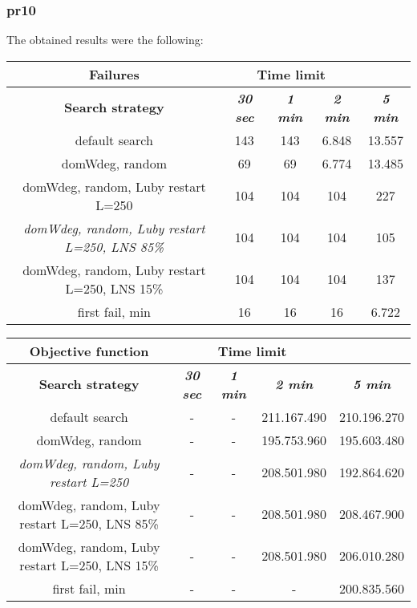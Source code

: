 \subsubsection{pr10}
The obtained results were the following:
{
\renewcommand{\arraystretch}{2}
\begin{longtable}[h]{| c | c | c | c | c |}
    \hline
    \textbf{Failures} & \multicolumn{3}{c}{Time limit} & \\
    \hline
    \textbf{Search strategy} & \textbf{\textit{30 sec}} & \textbf{\textit{1 min}} & \textbf{\textit{2 min}} & \textbf{\textit{5 min}} \\
    \hline
    \endhead
    default search                                         & 143 &  143 &  6.848 & 13.557 \\
    \hline
    domWdeg, random                                        &  69 &   69 &  6.774 & 13.485 \\
    \hline
    domWdeg, random, Luby restart L=250                    & 104 &  104 &  104 &    227 \\
    \hline
    \textit{domWdeg, random, Luby restart L=250, LNS 85\%} & 104 &  104 &  104 &    105 \\
    \hline
    domWdeg, random, Luby restart L=250, LNS 15\%          & 104 &  104 &  104 &    137 \\
    \hline
    first fail, min                                        &  16 &   16 &   16 &   6.722 \\
    \hline
\end{longtable}
}

{
\renewcommand{\arraystretch}{2}
\begin{longtable}[h]{| c | c | c | c | c |}
    \hline
    \textbf{Objective function} & \multicolumn{3}{c}{Time limit} & \\
    \hline
    \textbf{Search strategy} & \textbf{\textit{30 sec}} & \textbf{\textit{1 min}} & \textbf{\textit{2 min}} & \textbf{\textit{5 min}} \\
    \hline
    \endhead
    default search                                & - & - & 211.167.490 & 210.196.270 \\
    \hline
    domWdeg, random                               & - & - & 195.753.960 & 195.603.480 \\
    \hline
    \textit{domWdeg, random, Luby restart L=250}  & - & - & 208.501.980 & 192.864.620 \\
    \hline
    domWdeg, random, Luby restart L=250, LNS 85\% & - & - & 208.501.980 & 208.467.900 \\
    \hline
    domWdeg, random, Luby restart L=250, LNS 15\% & - & - & 208.501.980 & 206.010.280 \\
    \hline
    first fail, min                               & - & - &         - & 200.835.560 \\
    \hline
\end{longtable}
}

